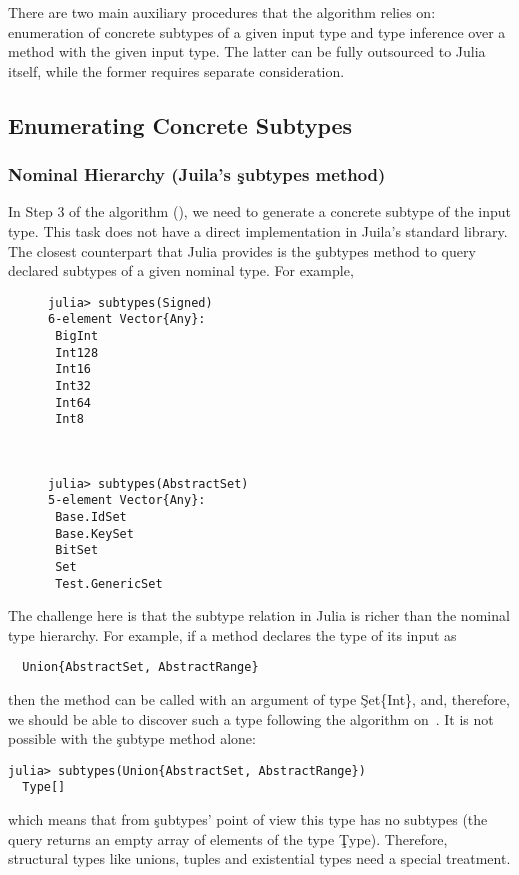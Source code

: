 There are two main auxiliary procedures that the algorithm relies on: enumeration of
concrete subtypes of a given input type and type inference over a method with the
given input type. The latter can be fully outsourced to Julia itself, while the
former requires separate consideration.

\subsection{Enumerating Concrete Subtypes}%
\label{sec:approx:enu}

\subsubsection{Nominal Hierarchy (Juila's \c{subtypes} method)}

In Step 3 of the algorithm (), we need to generate a
concrete subtype of the input type. This task does not have a direct
implementation in Juila's standard library. The closest counterpart that Julia
provides is the \c{subtypes} method to query declared subtypes of a given
nominal type. For example,
\begin{figure}[h]
\begin{minipage}{.49\textwidth}
\begin{lstlisting}[style=jterm]
julia> subtypes(Signed)
6-element Vector{Any}:
 BigInt
 Int128
 Int16
 Int32
 Int64
 Int8
\end{lstlisting}
\end{minipage}
~
\begin{minipage}{.49\textwidth}
\begin{lstlisting}[style=jterm]
julia> subtypes(AbstractSet)
5-element Vector{Any}:
 Base.IdSet
 Base.KeySet
 BitSet
 Set
 Test.GenericSet

\end{lstlisting}
\end{minipage}
\end{figure}

The challenge here is that the subtype relation in Julia is richer than the
nominal type hierarchy. For example, if a method declares the type of its input
as
\begin{lstlisting}
  Union{AbstractSet, AbstractRange}
\end{lstlisting}
then the method can be called with an argument of type \c{Set\{Int\}}, and,
therefore, we should be able to discover such a type following the algorithm
on~. It is not possible with the \c{subtype} method alone:
\begin{lstlisting}[style=jterm]
  julia> subtypes(Union{AbstractSet, AbstractRange})
  Type[]
\end{lstlisting}
which means that from \c{subtypes}' point of view this type has no subtypes (the query
returns an empty array of elements of the type \c{Type}). Therefore, structural
types like unions, tuples and existential types need a special treatment.


